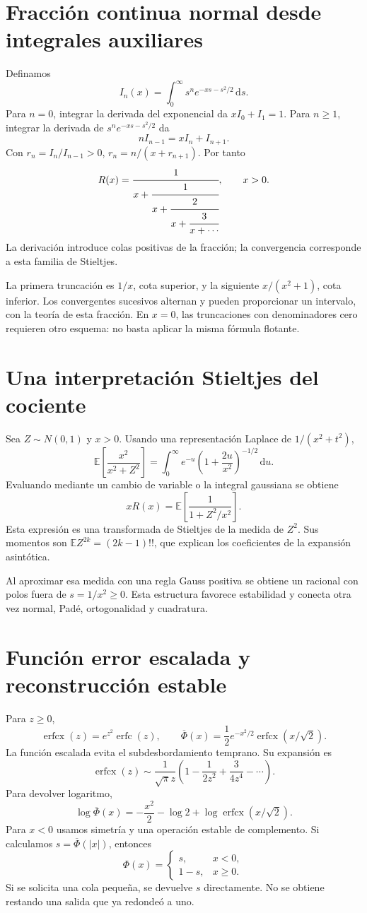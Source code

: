 \documentclass[11pt,a4paper]{article}
\newcommand{\E}{\mathbb E}
\newcommand{\dd}{\,\mathrm d}
\theoremstyle{definition}
\DeclareMathOperator{\erfc}{erfc}
\DeclareMathOperator{\erfcx}{erfcx}
\newcommand{\Q}{\overline\Phi}
\begin{document}
\section{Fracción continua normal desde integrales auxiliares}
Definamos
\[
I_n(x)=\int_0^\infty s^n e^{-xs-s^2/2}\dd s.
\]
Para $n=0$, integrar la derivada del exponencial da $xI_0+I_1=1$. Para $n\ge1$, integrar la derivada de $s^ne^{-xs-s^2/2}$ da
\[
nI_{n-1}=xI_n+I_{n+1}.
\]
Con $r_n=I_n/I_{n-1}>0$, $r_n=n/(x+r_{n+1})$. Por tanto
\[
R(x)=\cfrac1{x+\cfrac1{x+\cfrac2{x+\cfrac3{x+\cdots}}}},
\qquad x>0.
\]
La derivación introduce colas positivas de la fracción; la convergencia corresponde a esta familia de Stieltjes.

La primera truncación es $1/x$, cota superior, y la siguiente $x/(x^2+1)$, cota inferior. Los convergentes sucesivos alternan y pueden proporcionar un intervalo, con la teoría de esta fracción. En $x=0$, las truncaciones con denominadores cero requieren otro esquema: no basta aplicar la misma fórmula flotante.

\section{Una interpretación Stieltjes del cociente}
Sea $Z\sim N(0,1)$ y $x>0$. Usando una representación Laplace de $1/(x^2+t^2)$,
\[
\E\left[\frac{x^2}{x^2+Z^2}\right]
=\int_0^\infty e^{-u}
\left(1+\frac{2u}{x^2}\right)^{-1/2}\dd u.
\]
Evaluando mediante un cambio de variable o la integral gaussiana se obtiene
\[
xR(x)=\E\left[\frac1{1+Z^2/x^2}\right].
\]
Esta expresión es una transformada de Stieltjes de la medida de $Z^2$. Sus momentos son $\E Z^{2k}=(2k-1)!!$, que explican los coeficientes de la expansión asintótica.

Al aproximar esa medida con una regla Gauss positiva se obtiene un racional con polos fuera de $s=1/x^2\ge0$. Esta estructura favorece estabilidad y conecta otra vez normal, Padé, ortogonalidad y cuadratura.

\section{Función error escalada y reconstrucción estable}
Para $z\ge0$,
\[
\erfcx(z)=e^{z^2}\erfc(z),\qquad
\Q(x)=\frac12e^{-x^2/2}\erfcx(x/\sqrt2).
\]
La función escalada evita el subdesbordamiento temprano. Su expansión es
\[
\erfcx(z)\sim\frac1{\sqrt\pi z}
\left(1-\frac1{2z^2}+\frac3{4z^4}-\cdots\right).
\]
Para devolver logaritmo,
\[
\log\Q(x)=-\frac{x^2}2-\log2+\log\erfcx(x/\sqrt2).
\]
Para $x<0$ usamos simetría y una operación estable de complemento. Si calculamos $s=\Q(|x|)$, entonces
\[
\Phi(x)=
\begin{cases}s,&x<0,\\1-s,&x\ge0.\end{cases}
\]
Si se solicita una cola pequeña, se devuelve $s$ directamente. No se obtiene restando una salida que ya redondeó a uno.
\end{document}
